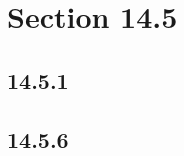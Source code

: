 





\section*{Section 14.5}

\subsection*{14.5.1}
\begin{enumerate}
\end{enumerate}

\subsection*{14.5.6}
\begin{enumerate}
\end{enumerate}


